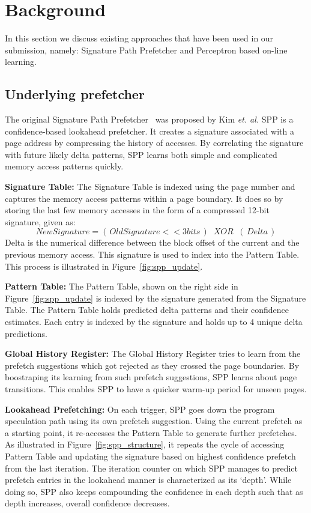 \section{Background}
\label{Background}
In this section we discuss existing approaches that have been 
used in our submission, namely: Signature Path Prefetcher and Perceptron 
based on-line learning.

\subsection{Underlying prefetcher}
\label{sec:Background-SPP}
The original Signature Path Prefetcher~\cite{SPP} was proposed by Kim 
{\em et. al.} SPP is a confidence-based lookahead prefetcher. 
It creates a signature associated with a page address by compressing 
the history of accesses. By correlating the signature with future 
likely delta patterns, SPP learns both simple and complicated 
memory access patterns quickly.

\noindent \textbf{Signature Table:} 
The Signature Table is indexed using the page number and captures the memory 
access patterns within a page boundary. It does so by storing the last few
memory accesses in the form of a compressed 12-bit signature, given as:
$$New Signature = (\,Old Signature << 3 bits\,) \;\;XOR\;\; (\,Delta\,)$$ 
Delta is the numerical difference between the block offset of the current 
and the previous memory access. This signature is used to index into the 
Pattern Table. This process is illustrated in Figure~\ref{fig:spp_update}.

\noindent \textbf{Pattern Table:} 
The Pattern Table, shown on the right side in Figure~\ref{fig:spp_update} 
is indexed by the signature generated from the Signature Table. The Pattern 
Table holds predicted delta patterns and their confidence estimates. Each 
entry is indexed by the signature and holds up to 4 unique delta predictions.

\noindent \textbf{Global History Register:} 
The Global History Register tries to learn from the prefetch suggestions which
got rejected as they crossed the page boundaries. By boostraping its learning
from such prefetch suggestions, SPP learns about page transitions. This enables 
SPP to have a quicker warm-up period for unseen pages. 

\noindent \textbf{Lookahead Prefetching:} On each trigger, SPP goes
down the program speculation path using its own prefetch suggestion.
Using the current prefetch as a starting point, it re-accesses the Pattern
Table to generate further prefetches. As illustrated in
Figure~\ref{fig:spp_structure}, it repeats the cycle of accessing
Pattern Table and updating the signature based on highest confidence
prefetch from the last iteration. The iteration counter on which SPP
manages to predict prefetch entries in the lookahead manner is
characterized as its `depth'. While doing so, SPP also keeps
compounding the confidence in each depth such that as depth increases,
overall confidence decreases.

